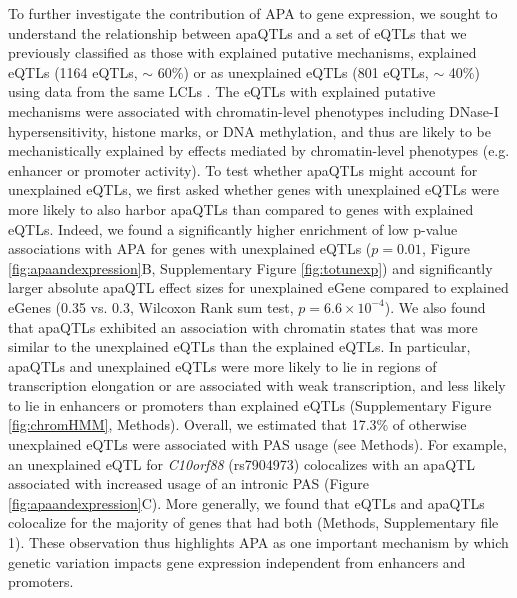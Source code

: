 To further investigate the contribution of APA to gene expression, we sought to understand the relationship between apaQTLs and a set of eQTLs that we previously classified as those with explained putative mechanisms, explained eQTLs (1164 eQTLs, $\sim$ 60\%) or as unexplained eQTLs (801 eQTLs, $\sim$ 40\%) using data from the same LCLs \citep{li_rna_2016}. The eQTLs with explained putative mechanisms were associated with chromatin-level phenotypes including DNase-I hypersensitivity, histone marks, or DNA methylation, and thus are likely to be mechanistically explained by effects mediated by chromatin-level phenotypes (e.g. enhancer or promoter activity). To test whether apaQTLs might account for unexplained eQTLs, we first asked whether genes with unexplained eQTLs were more likely to also harbor apaQTLs than compared to genes with explained eQTLs. Indeed, we found a significantly higher enrichment of low p-value associations with APA for genes with unexplained eQTLs ($p = 0.01$, Figure \ref{fig:apaandexpression}B, Supplementary Figure \ref{fig:totunexp}) and significantly larger absolute apaQTL effect sizes for unexplained eGene compared to explained eGenes (0.35 vs. 0.3, Wilcoxon Rank sum test, $p=6.6 \times 10^{-4}$). We also found that apaQTLs exhibited an association with chromatin states that was more similar to the unexplained eQTLs than the explained eQTLs. In particular, apaQTLs and unexplained eQTLs were more likely to lie in regions of transcription elongation or are associated with weak transcription, and less likely to lie in enhancers or promoters than explained eQTLs (Supplementary Figure \ref{fig:chromHMM}, Methods). Overall, we estimated that 17.3\% of otherwise unexplained eQTLs were associated with PAS usage (see Methods). For example, an unexplained eQTL for \textit{C10orf88} (rs7904973) colocalizes with an apaQTL associated with increased usage of an intronic PAS (Figure \ref{fig:apaandexpression}C). More generally, we found that eQTLs and apaQTLs colocalize for the majority of genes that had both (Methods, Supplementary file 1). These observation thus highlights APA as one important mechanism by which genetic variation impacts gene expression independent from enhancers and promoters. 
  

